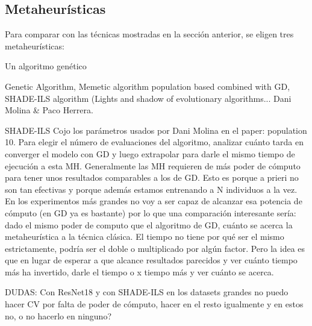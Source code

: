 \subsection{Metaheurísticas}

Para comparar con las técnicas mostradas en la sección anterior, se eligen tres metaheurísticas:

Un algoritmo genético

Genetic Algorithm, Memetic algorithm population based combined with GD, SHADE-ILS algorithm (Lights and shadow of evolutionary algorithms... Dani Molina \& Paco Herrera. 




SHADE-ILS
Cojo los parámetros usados por Dani Molina en el paper: population 10. Para elegir el número de evaluaciones del algoritmo, analizar cuánto tarda en converger el modelo con GD y luego extrapolar para darle el mismo tiempo de ejecución a esta MH. Generalmente las MH requieren de más poder de cómputo para tener unos resultados comparables a los de GD. Esto es porque a prieri no son tan efectivas y porque además estamos entrenando a N individuos a la vez. En los experimentos más grandes no voy a ser capaz de alcanzar esa potencia de cómputo (en GD ya es bastante) por lo que una comparación interesante sería: dado el mismo poder de computo que el algoritmo de GD, cuánto se acerca la metaheurística a la técnica clásica. El tiempo no tiene por qué ser el mismo estrictamente, podría ser el doble o multiplicado por algún factor. Pero la idea es que en lugar de esperar a que alcance resultados parecidos y ver cuánto tiempo más ha invertido, darle el tiempo o x tiempo más y ver cuánto se acerca.

DUDAS:
Con ResNet18 y con SHADE-ILS en los datasets grandes no puedo hacer CV por falta de poder de cómputo, hacer en el resto igualmente y en estos no, o no hacerlo en ninguno?